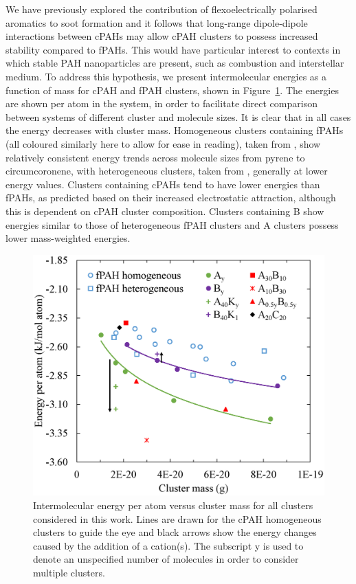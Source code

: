 We have previously explored the contribution of flexoelectrically polarised aromatics to soot formation \cite{Martin2018flexo} and it follows that long-range dipole-dipole interactions between cPAHs may allow cPAH clusters to possess increased stability compared to fPAHs.  This would have particular interest to contexts in which stable PAH nanoparticles are present, such as combustion and interstellar medium.  To address this hypothesis, we present intermolecular energies as a function of mass for cPAH and fPAH clusters, shown in Figure~\ref{fig:energies}.  The energies are shown per atom in the system, in order to facilitate direct comparison between systems of different cluster and molecule sizes. It is clear that in all cases the energy decreases with cluster mass. Homogeneous clusters containing fPAHs (all coloured similarly here to allow for ease in reading), taken from \citet{chen2014size,chen2015solid}, show relatively consistent energy trends across molecule sizes from pyrene to circumcoronene, with heterogeneous clusters, taken from \citet{bowal2018partitioning}, generally at lower energy values. Clusters containing cPAHs tend to have lower energies than fPAHs, as predicted based on their increased electrostatic attraction, although this is dependent on cPAH cluster composition. Clusters containing B show energies similar to those of heterogeneous fPAH clusters and A clusters possess lower mass-weighted energies.
%
\begin{figure}[!tbh]
\centering
\includegraphics[width=0.8\linewidth]{Figures/energies.eps}
\caption{Intermolecular energy per atom versus cluster mass for all clusters considered in this work. Lines are drawn for the cPAH homogeneous clusters to guide the eye and black arrows show the energy changes caused by the addition of a cation(s). The subscript y is used to denote an unspecified number of molecules in order to consider multiple clusters.}
\label{fig:energies}
\end{figure}

